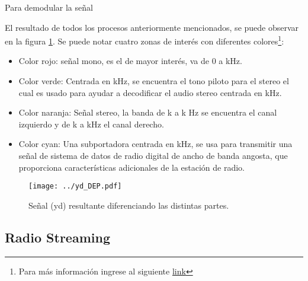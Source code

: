 Para demodular la señal 

El resultado de todos los procesos anteriormente mencionados, se puede observar en la figura \ref{fig:yd-DEP}.
Se puede notar cuatro zonas de interés con diferentes colores\footnote{Para más información ingrese al siguiente \href{https://en.wikipedia.org/wiki/FM\_broadcasting\#Other\_subcarrier\_services}{link}}:

\begin{itemize}
	\item Color rojo: señal mono, es el de mayor interés, va de 0 a \limitMono kHz.
	\item Color verde: Centrada en \pilotTone kHz, se encuentra el tono piloto para el stereo el cual es usado para ayudar a decodificar el audio stereo centrada en \centeredStereo kHz.
	\item Color naranja: Señal stereo, la banda de \leftLimitStereo k a \centeredStereo k Hz se encuentra el canal izquierdo y de \centeredStereo k a \rightLimitStereo kHz el canal derecho.  
	\item Color cyan: Una subportadora centrada en \digitalCarrier kHz, se usa para transmitir una señal de sistema de datos de radio digital de ancho de banda angosta, que proporciona características adicionales de la estación de radio.
\end{itemize}

\begin{figure}[ht!]
	\centering
	\texttt{[image: ../yd\_DEP.pdf]}
	\caption{Señal (yd) resultante diferenciando las distintas partes.}
	\label{fig:yd-DEP}
\end{figure}

\newpage

\subsection{Radio Streaming}